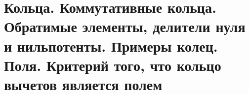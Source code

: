 \section{Кольца. Коммутативные кольца. Обратимые элементы, делители нуля и нильпотенты. Примеры колец. Поля. Критерий того, что кольцо вычетов является полем}